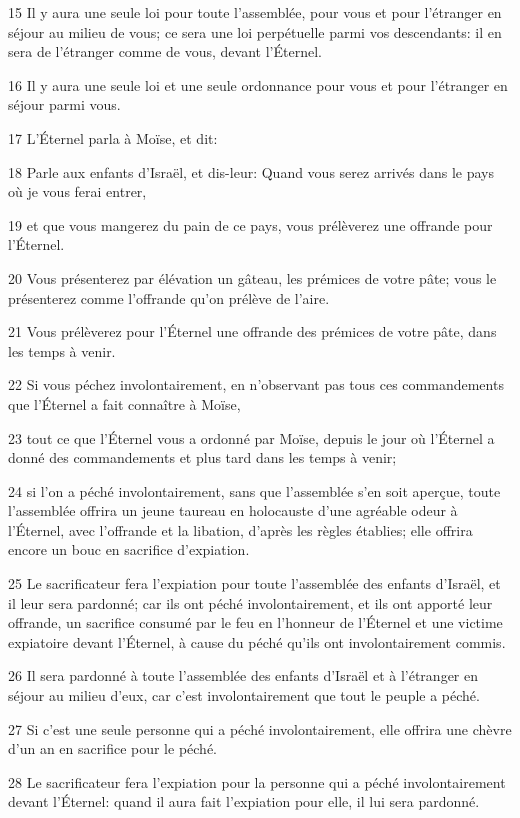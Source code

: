 \par 15 Il y aura une seule loi pour toute l'assemblée, pour vous et pour l'étranger en séjour au milieu de vous; ce sera une loi perpétuelle parmi vos descendants: il en sera de l'étranger comme de vous, devant l'Éternel.
\par 16 Il y aura une seule loi et une seule ordonnance pour vous et pour l'étranger en séjour parmi vous.
\par 17 L'Éternel parla à Moïse, et dit:
\par 18 Parle aux enfants d'Israël, et dis-leur: Quand vous serez arrivés dans le pays où je vous ferai entrer,
\par 19 et que vous mangerez du pain de ce pays, vous prélèverez une offrande pour l'Éternel.
\par 20 Vous présenterez par élévation un gâteau, les prémices de votre pâte; vous le présenterez comme l'offrande qu'on prélève de l'aire.
\par 21 Vous prélèverez pour l'Éternel une offrande des prémices de votre pâte, dans les temps à venir.
\par 22 Si vous péchez involontairement, en n'observant pas tous ces commandements que l'Éternel a fait connaître à Moïse,
\par 23 tout ce que l'Éternel vous a ordonné par Moïse, depuis le jour où l'Éternel a donné des commandements et plus tard dans les temps à venir;
\par 24 si l'on a péché involontairement, sans que l'assemblée s'en soit aperçue, toute l'assemblée offrira un jeune taureau en holocauste d'une agréable odeur à l'Éternel, avec l'offrande et la libation, d'après les règles établies; elle offrira encore un bouc en sacrifice d'expiation.
\par 25 Le sacrificateur fera l'expiation pour toute l'assemblée des enfants d'Israël, et il leur sera pardonné; car ils ont péché involontairement, et ils ont apporté leur offrande, un sacrifice consumé par le feu en l'honneur de l'Éternel et une victime expiatoire devant l'Éternel, à cause du péché qu'ils ont involontairement commis.
\par 26 Il sera pardonné à toute l'assemblée des enfants d'Israël et à l'étranger en séjour au milieu d'eux, car c'est involontairement que tout le peuple a péché.
\par 27 Si c'est une seule personne qui a péché involontairement, elle offrira une chèvre d'un an en sacrifice pour le péché.
\par 28 Le sacrificateur fera l'expiation pour la personne qui a péché involontairement devant l'Éternel: quand il aura fait l'expiation pour elle, il lui sera pardonné.
